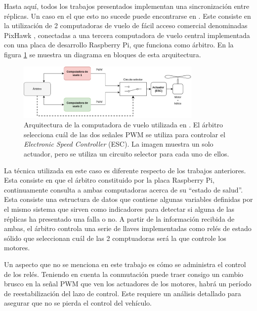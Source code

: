 Hasta aquí, todos los trabajos presentados implementan una sincronización entre réplicas. Un caso en el que esto no sucede puede encontrarse en \cite{thesis_redundant_ROS}. Este consiste en la utilización de 2 computadoras de vuelo de fácil acceso comercial denominadas PixHawk \cite{dronecode-foundation-2023}, conectadas a una tercera computadora de vuelo central implementada con una placa de desarrollo Raspberry Pi, que funciona como árbitro. En la figura \ref{fig:ROS_redundancy} se muestra un diagrama en bloques de esta arquitectura.

\begin{figure}[htb]
    \centering
    \includegraphics[width=0.8\textwidth]{img/ROS_redundancy.png}
    \caption{Arquitectura de la computadora de vuelo utilizada en \cite{thesis_redundant_ROS}. El árbitro selecciona cuál de las dos señales PWM se utiliza para controlar el \textit{Electronic Speed Controller} (ESC). La imagen muestra un solo actuador, pero se utiliza un circuito selector para cada uno de ellos.}
    \label{fig:ROS_redundancy}
\end{figure}

La técnica utilizada en este caso es diferente respecto de los trabajos anteriores. Esta consiste en que el árbitro constituido por la placa Raspberry Pi, continuamente consulta a ambas computadoras acerca de su ``estado de salud''. Esta consiste una estructura de datos que contiene algunas variables definidas por el mismo sistema que sirven como indicadores para detectar si alguna de las réplicas ha presentado una falla o no. A partir de la información recibida de ambas, el árbitro controla una serie de llaves implementadas como relés de estado sólido que seleccionan cuál de las 2 comptuadoras será la que controle los motores.

Un aspecto que no se menciona en este trabajo es cómo se administra el control de los relés. Teniendo en cuenta la conmutación puede traer consigo un cambio brusco en la señal PWM que ven los actuadores de los motores, habrá un período de reestabilización del lazo de control. Este requiere un análisis detallado para asegurar que no se pierda el control del vehículo.




